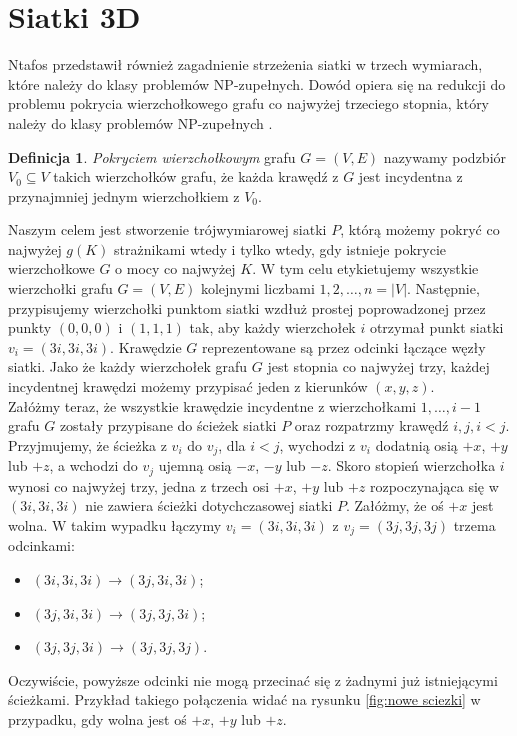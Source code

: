 \documentclass[brudnopis]{xmgr}
\theoremstyle{definition}
\newtheorem{Definicja}{Definicja}
\begin{document}
 \section{Siatki 3D}
 	Ntafos\cite{ntafos} przedstawił również zagadnienie strzeżenia siatki w trzech wymiarach, które należy do klasy problemów NP-zupełnych. Dowód opiera się na redukcji do problemu pokrycia wierzchołkowego grafu co najwyżej trzeciego stopnia, który należy do klasy problemów NP-zupełnych \cite{garey}.
\begin{Definicja}
	\emph{Pokryciem wierzchołkowym} grafu $G = (V,E)$ nazywamy podzbiór $V_0 \subseteq V$ takich wierzchołków grafu, że każda krawędź z $G$ jest incydentna z przynajmniej jednym wierzchołkiem z $V_0$.
\end{Definicja}
Naszym celem jest stworzenie trójwymiarowej siatki $P$, którą możemy pokryć co najwyżej $g(K)$ strażnikami wtedy i tylko wtedy, gdy istnieje pokrycie wierzchołkowe $G$ o mocy co najwyżej $K$.
W tym celu etykietujemy wszystkie wierzchołki grafu $G = (V,E)$ kolejnymi liczbami $1,2,\ldots,n = |V|$. Następnie, przypisujemy wierzchołki punktom siatki wzdłuż prostej poprowadzonej przez punkty $(0,0,0)$ i $(1,1,1)$ tak, aby każdy wierzchołek $i$ otrzymał punkt siatki $v_i = (3i, 3i, 3i)$. Krawędzie $G$ reprezentowane są przez odcinki łączące węzły siatki. Jako że każdy wierzchołek grafu $G$ jest stopnia co najwyżej trzy, każdej incydentnej krawędzi możemy przypisać jeden z kierunków $(x,y,z)$.
\\\indent Załóżmy teraz, że wszystkie krawędzie incydentne z wierzchołkami $1,\ldots,i - 1$ grafu $G$ zostały przypisane do ścieżek siatki $P$ oraz rozpatrzmy krawędź ${i,j}, i < j$. Przyjmujemy, że ścieżka z $v_i$ do $v_j$, dla $i < j$, wychodzi z $v_i$ dodatnią osią $+x$, $+y$ lub $+z$, a wchodzi do $v_j$ ujemną osią $-x$, $-y$ lub $-z$. Skoro stopień wierzchołka $i$ wynosi co najwyżej trzy, jedna z trzech osi $+x$, $+y$ lub $+z$ rozpoczynająca się w $(3i, 3i, 3i)$ nie zawiera ścieżki dotychczasowej siatki $P$. Załóżmy, że oś $+x$ jest wolna. W takim wypadku łączymy $v_i = (3i, 3i, 3i)$ z $v_j = (3j, 3j, 3j)$ trzema odcinkami:
\begin{itemize}
	\item $(3i, 3i, 3i) \rightarrow (3j, 3i, 3i)$;
	\item $(3j, 3i, 3i) \rightarrow (3j, 3j, 3i)$;
	\item $(3j, 3j, 3i) \rightarrow (3j, 3j, 3j)$.
\end{itemize}
Oczywiście, powyższe odcinki nie mogą przecinać się z żadnymi już istniejącymi ścieżkami. Przykład takiego połączenia widać na rysunku \ref{fig:nowe sciezki} w przypadku, gdy wolna jest oś $+x$, $+y$ lub $+z$.
\end{document}
